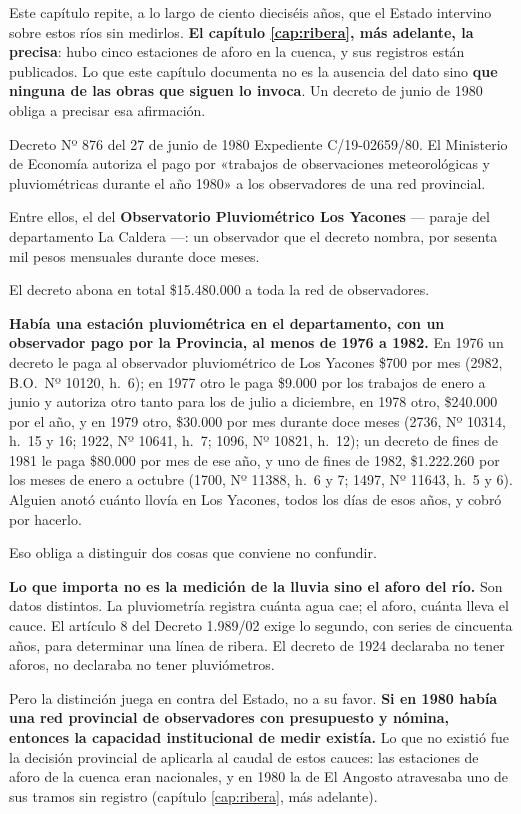Este capítulo repite, a lo largo de ciento dieciséis años, que el Estado intervino sobre estos ríos sin medirlos. \textbf{El capítulo \ref{cap:ribera}, más adelante, la precisa}: hubo cinco estaciones de aforo en la cuenca, y sus registros están publicados. Lo que este capítulo documenta no es la ausencia del dato sino \textbf{que ninguna de las obras que siguen lo invoca}. Un
decreto de junio de 1980 obliga a precisar esa afirmación.

\begin{ficha}{Decreto Nº 876 del 27 de junio de 1980}
Expediente C/19-02659/80. El Ministerio de Economía autoriza el pago por «trabajos de
observaciones meteorológicas y pluviométricas durante el año 1980» a los observadores de una
red provincial.

Entre ellos, el del \textbf{Observatorio Pluviométrico Los Yacones} --- paraje del
departamento La Caldera ---: un observador que el decreto nombra, por sesenta mil pesos
mensuales durante doce meses.

El decreto abona en total \$15.480.000 a toda la red de observadores.
\end{ficha}

\textbf{Había una estación pluviométrica en el departamento, con un observador pago por la
Provincia, al menos de 1976 a 1982.} En 1976 un decreto le paga al observador pluviométrico de Los Yacones \$700 por mes (2982, B.O.\ Nº 10120, h.\ 6); en 1977 otro le paga \$9.000 por los trabajos de enero a junio y autoriza otro tanto para los de julio a diciembre, en 1978 otro, \$240.000 por el año, y en 1979 otro, \$30.000 por mes durante doce meses (2736, Nº 10314, h.\ 15 y 16; 1922, Nº 10641, h.\ 7; 1096, Nº 10821, h.\ 12); un decreto de fines de 1981 le paga \$80.000 por mes de ese año, y uno de fines de 1982, \$1.222.260 por los meses de enero a octubre (1700, Nº 11388, h.\ 6 y 7; 1497, Nº 11643, h.\ 5 y 6). Alguien anotó cuánto llovía en Los Yacones, todos los días de
esos años, y cobró por hacerlo.

Eso obliga a distinguir dos cosas que conviene no confundir.

\textbf{Lo que importa no es la medición de la lluvia sino el aforo del río.} Son datos
distintos. La pluviometría registra cuánta agua cae; el aforo, cuánta lleva el cauce. El
artículo 8 del Decreto 1.989/02 exige lo segundo, con series de cincuenta años, para
determinar una línea de ribera. El decreto de 1924 declaraba no tener aforos, no declaraba no
tener pluviómetros.

Pero la distinción juega en contra del Estado, no a su favor. \textbf{Si en 1980 había una
red provincial de observadores con presupuesto y nómina, entonces la capacidad institucional
de medir existía.} Lo que no existió fue la decisión provincial de aplicarla al caudal de estos cauces: las estaciones de aforo de la cuenca eran nacionales, y en 1980 la de El Angosto atravesaba uno de sus tramos sin registro (capítulo \ref{cap:ribera}, más adelante).


